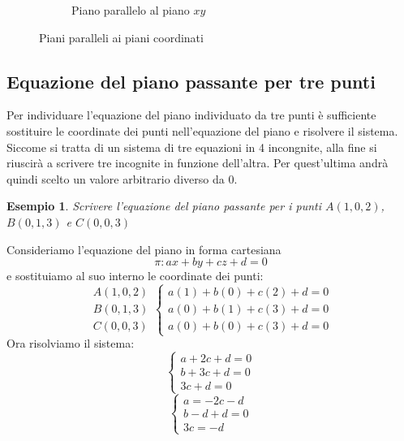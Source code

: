 \documentclass{article}     %
\newtheorem{ex}{Esempio}[section]
\begin{document}
\begin{center}
\begin{figure}[h]
\begin{subfigure}{0.3\textwidth}
\begin{center}
\begin{tikzpicture}[scale=0.8]
                            \end{tikzpicture}
                        \end{center}
                        \caption{Piano parallelo al piano $xy$}
                    \end{subfigure}
                    \caption{Piani paralleli ai piani coordinati}
                \end{figure}
            \end{center}
        \subsection{Equazione del piano passante per tre punti}
            Per individuare l'equazione del piano individuato da tre punti è sufficiente sostituire le coordinate dei punti nell'equazione del piano e risolvere il sistema. Siccome si tratta di un sistema di tre equazioni in 4 incongnite, alla fine si riuscirà a scrivere tre incognite in funzione dell'altra. Per quest'ultima andrà quindi scelto un valore arbitrario diverso da 0.
            \begin{ex}
                Scrivere l'equazione del piano passante per i punti $A(1,0,2)$, $B(0,1,3)$ e $C(0,0,3)$
            \end{ex}
                Consideriamo l'equazione del piano in forma cartesiana \[\pi:ax+by+cz+d=0\] e sostituiamo al suo interno le coordinate dei punti:
                \[\begin{array}{l}
                    A(1,0,2)\\
                    B(0,1,3)\\
                    C(0,0,3)
                \end{array} \left\{
                \begin{array}{l}
                    a(1)+b(0)+c(2)+d=0\\
                    a(0)+b(1)+c(3)+d=0\\
                    a(0)+b(0)+c(3)+d=0
                \end{array} \right.
                \]
                Ora risolviamo il sistema:
                \[\left\{\begin{array}{l}
                    a+2c+d=0\\
                    b+3c+d=0\\
                    3c+d=0
                \end{array} \right.\]
                \[\left\{\begin{array}{l}
                    a=-2c-d\\
                    b-d+d=0\\
                    3c=-d
                \end{array} \right.\]
\end{document}
